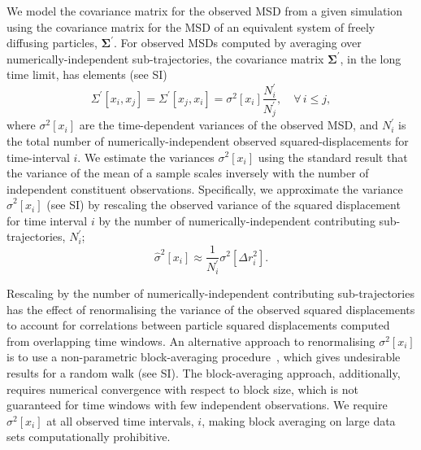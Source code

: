 \documentclass[reprint,superscriptaddress,nobibnotes,amsmath,amssymb,aps,prx,hidelinks,linenumbers]{revtex4-2}
\newcommand{\oMSDi}{\ensuremath{x_i}}
\newcommand{\oMSDj}{\ensuremath{x_j}}
\newcommand{\nind}[1]{\ensuremath{N^\prime_{#1}}}
\newcommand{\var}[1]{\ensuremath{\sigma^2[#1]}}
\newcommand{\varest}[1]{\ensuremath{\widehat{\sigma}^2[#1]}}
\begin{document}
We model the covariance matrix for the observed MSD from a given simulation using the covariance matrix for the MSD of an equivalent system of freely diffusing particles, $\mathbf{\Sigma^\prime}$.
For observed MSDs computed by averaging over numerically-independent sub-trajectories, the covariance matrix $\mathbf{\Sigma^\prime}$, in the long time limit, has elements (see SI)
%
\begin{equation}
  \Sigma^\prime\left[\oMSDi, \oMSDj\right]= \Sigma^\prime\left[\oMSDj, \oMSDi\right] =
  \var{\oMSDi} \frac{\nind{i}}{\nind{j}},\hspace{1em} \forall\,i \leq j,
  \label{equ:cvv}
\end{equation} 
%
where $\var{\oMSDi}$ are the time-dependent variances of the observed MSD, and $\nind{i}$ is the total number of numerically-independent observed squared-displacements for time-interval $i$.
We estimate the variances $\var{\oMSDi}$ using the standard result that the variance of the mean of a sample scales inversely with the number of independent constituent observations.
Specifically, we approximate the variance $\varest{\oMSDi}$ (see SI) by rescaling the observed variance of the squared displacement for time interval $i$ by the number of numerically-independent contributing sub-trajectories, $\nind{i}$;
%
\begin{equation}
  \varest{\oMSDi} \approx \frac{1}{\nind{i}}\var{\Delta r_i^2}.
  \label{equ:varestMSD}
\end{equation}
%

Rescaling by the number of numerically-independent contributing sub-trajectories has the effect of renormalising the variance of the observed squared displacements to account for correlations between particle squared displacements computed from overlapping time windows. 
An alternative approach to renormalising $\var{x_i}$ is to use a non-parametric block-averaging procedure~\cite{flyvbjerg_error_1989,frenkel_understanding_2023,materzanini_high_2021}, which gives undesirable results for a random walk (see SI). 
The block-averaging approach, additionally, requires numerical convergence with respect to block size, which is not guaranteed for time windows with few independent observations. 
We require $\var{x_i}$ at all observed time intervals, $i$, making block averaging on large data sets computationally prohibitive. 
\end{document}
